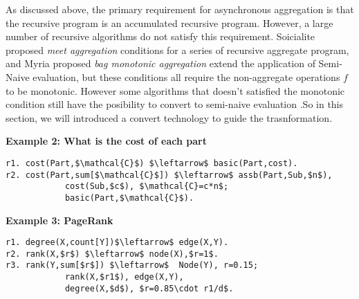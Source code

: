 As discussed above, the primary requirement for asynchronous aggregation is that the recursive program is an accumulated recursive program. %
However, a large number of recursive algorithms do not satisfy this requirement. {\color{red} Soicialite proposed \emph{meet aggregation} conditions for a series of recursive aggregate program, and Myria proposed \emph{bag monotonic aggregation} extend the application of Semi-Naive evaluation, but these conditions all require the non-aggregate operations $f$ to be monotonic. However some algorithms that doesn't satisfied the monotonic condition still have the posibility to convert to semi-naive evaluation }.So in this section, we will introduced a convert technology to guide the trasnformation.


\textbf{Example 2: What is the cost of each part}
\small
\begin{lstlisting}
r1. cost(Part,$\mathcal{C}$) $\leftarrow$ basic(Part,cost).
r2. cost(Part,sum[$\mathcal{C}$]) $\leftarrow$ assb(Part,Sub,$n$),
			cost(Sub,$c$), $\mathcal{C}=c*n$;
			basic(Part,$\mathcal{C}$).
\end{lstlisting}
\normalsize



\textbf{Example 3: PageRank}
\small
\begin{lstlisting}
r1. degree(X,count[Y])$\leftarrow$ edge(X,Y).
r2. rank(X,$r$) $\leftarrow$ node(X),$r=1$.
r3. rank(Y,sum[$r$]) $\leftarrow$  Node(Y), r=0.15;
			rank(X,$r1$), edge(X,Y),
			degree(X,$d$), $r=0.85\cdot r1/d$.
\end{lstlisting}
\normalsize


